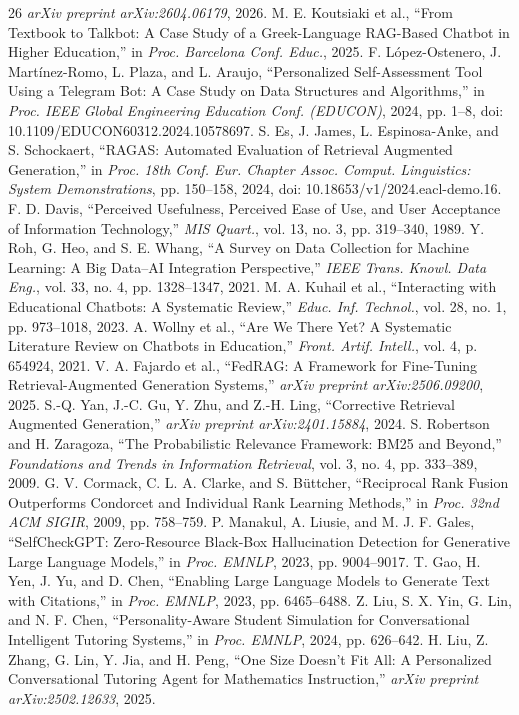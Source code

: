 \documentclass[conference]{IEEEtran}
\begin{document}
\begin{thebibliography}{26}
\textit{arXiv preprint arXiv:2604.06179}, 2026.
M. E. Koutsiaki et al., ``From Textbook to Talkbot: A Case Study of a
Greek-Language RAG-Based Chatbot in Higher Education,'' in
\textit{Proc. Barcelona Conf. Educ.}, 2025.
F. L\'opez-Ostenero, J. Mart\'inez-Romo, L. Plaza, and L. Araujo,
``Personalized Self-Assessment Tool Using a Telegram Bot: A Case Study on
Data Structures and Algorithms,'' in \textit{Proc. IEEE Global Engineering
Education Conf. (EDUCON)}, 2024, pp. 1--8,
doi: 10.1109/EDUCON60312.2024.10578697.
S. Es, J. James, L. Espinosa-Anke, and S. Schockaert,
``RAGAS: Automated Evaluation of Retrieval Augmented Generation,''
in \textit{Proc. 18th Conf. Eur. Chapter Assoc. Comput. Linguistics: System
Demonstrations}, pp. 150--158, 2024, doi: 10.18653/v1/2024.eacl-demo.16.
F. D. Davis, ``Perceived Usefulness, Perceived Ease of Use, and User
Acceptance of Information Technology,'' \textit{MIS Quart.}, vol. 13,
no. 3, pp. 319--340, 1989.
Y. Roh, G. Heo, and S. E. Whang, ``A Survey on Data Collection for
Machine Learning: A Big Data--AI Integration Perspective,''
\textit{IEEE Trans. Knowl. Data Eng.}, vol. 33, no. 4,
pp. 1328--1347, 2021.
M. A. Kuhail et al., ``Interacting with Educational Chatbots: A
Systematic Review,'' \textit{Educ. Inf. Technol.}, vol. 28, no. 1,
pp. 973--1018, 2023.
A. Wollny et al., ``Are We There Yet? A Systematic Literature Review on
Chatbots in Education,'' \textit{Front. Artif. Intell.}, vol. 4,
p. 654924, 2021.
V. A. Fajardo et al., ``FedRAG: A Framework for Fine-Tuning
Retrieval-Augmented Generation Systems,''
\textit{arXiv preprint arXiv:2506.09200}, 2025.
S.-Q. Yan, J.-C. Gu, Y. Zhu, and Z.-H. Ling, ``Corrective Retrieval
Augmented Generation,'' \textit{arXiv preprint arXiv:2401.15884}, 2024.
S. Robertson and H. Zaragoza, ``The Probabilistic Relevance Framework: BM25
and Beyond,'' \textit{Foundations and Trends in Information Retrieval},
vol. 3, no. 4, pp. 333--389, 2009.
G. V. Cormack, C. L. A. Clarke, and S. B\"{u}ttcher, ``Reciprocal Rank Fusion
Outperforms Condorcet and Individual Rank Learning Methods,'' in
\textit{Proc. 32nd ACM SIGIR}, 2009, pp. 758--759.
P. Manakul, A. Liusie, and M. J. F. Gales, ``SelfCheckGPT: Zero-Resource
Black-Box Hallucination Detection for Generative Large Language Models,'' in
\textit{Proc. EMNLP}, 2023, pp. 9004--9017.
T. Gao, H. Yen, J. Yu, and D. Chen, ``Enabling Large Language Models to
Generate Text with Citations,'' in \textit{Proc. EMNLP}, 2023,
pp. 6465--6488.
Z. Liu, S. X. Yin, G. Lin, and N. F. Chen, ``Personality-Aware Student
Simulation for Conversational Intelligent Tutoring Systems,'' in
\textit{Proc. EMNLP}, 2024, pp. 626--642.
H. Liu, Z. Zhang, G. Lin, Y. Jia, and H. Peng, ``One Size Doesn't Fit All: A
Personalized Conversational Tutoring Agent for Mathematics Instruction,''
\textit{arXiv preprint arXiv:2502.12633}, 2025.
\end{thebibliography}
\end{document}
